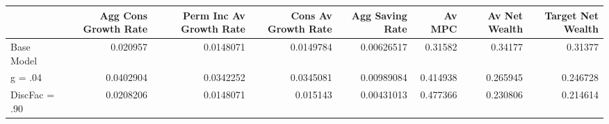 \begin{tabular}{lrrrrrrr}
\hline
               &   Agg Cons Growth Rate &   Perm Inc Av Growth Rate &   Cons Av Growth Rate &   Agg Saving Rate &   Av MPC &   Av Net Wealth &   Target Net Wealth \\
\hline
 Base Model    &              0.020957  &                 0.0148071 &             0.0149784 &        0.00626517 & 0.31582  &        0.34177  &            0.31377  \\
 g = .04       &              0.0402904 &                 0.0342252 &             0.0345081 &        0.00989084 & 0.414938 &        0.265945 &            0.246728 \\
 DiscFac = .90 &              0.0208206 &                 0.0148071 &             0.015143  &        0.00431013 & 0.477366 &        0.230806 &            0.214614 \\
\hline
\end{tabular}